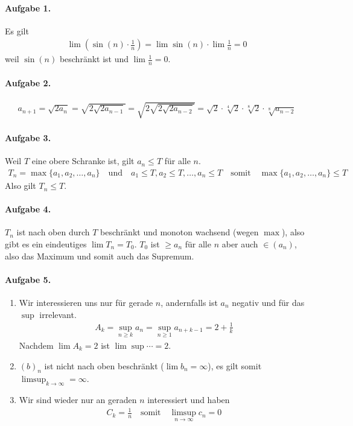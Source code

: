 \documentclass{article}
\begin{document}
\paragraph{Aufgabe 1.} Es gilt
\begin{align*}
    \lim \left(\sin(n) \cdot \frac{1}{n}\right) = \lim\sin(n) \cdot \lim\frac{1}{n} = 0
\end{align*}
weil $\sin(n)$ beschränkt ist und $\lim \frac{1}{n} = 0$.

\paragraph*{Aufgabe 2.}
\begin{align*}
    a_{n + 1} = \sqrt{2a_n} = \sqrt{2\sqrt{2a_{n - 1}}} = \sqrt{2\sqrt{2\sqrt{2a_{n - 2}}}} = \sqrt{2} \cdot \sqrt[4]{2} \cdot \sqrt[8]{2} \cdot \sqrt[8]{a_{n - 2}} 
\end{align*}

\paragraph{Aufgabe 3.} Weil $T$ eine obere Schranke ist, gilt $a_n \leq T$ für alle $n$.
\begin{align*}
    T_n = \max\{a_1, a_2, \ldots, a_n\} \quad \text{und} \quad a_1 \leq T, a_2 \leq T, \ldots, a_n \leq T \quad \text{somit} \quad \max\{a_1, a_2, \ldots, a_n\} \leq T
\end{align*}
Also gilt $T_n \leq T$.

\paragraph*{Aufgabe 4.} $T_n$ ist nach oben durch $T$ beschränkt und monoton wachsend (wegen $\max$), also gibt es ein eindeutiges $\lim T_n = T_0$. $T_0$ ist $\geq a_n$ für alle $n$ aber auch $\in (a_n)$, also das Maximum und somit auch das Supremum. 

\paragraph*{Aufgabe 5.}
\begin{enumerate}
    \item Wir interessieren uns nur für gerade $n$, andernfalls ist $a_n$ negativ und für das $\sup$ irrelevant.
    \begin{align*}
        A_k = \sup_{n \geq k} a_n = \sup_{n \geq 1}a_{n + k - 1} = 2 + \frac{1}{k}
    \end{align*}
    Nachdem $\lim A_k = 2$ ist $\lim \sup \cdots = 2$.

    \item $(b)_n$ ist nicht nach oben beschränkt ($\lim b_n = \infty$), es gilt somit $\limsup_{k \to \infty} = \infty$.
    
    \item Wir sind wieder nur an geraden $n$ interessiert und haben
    \begin{align*}
        C_k = \frac{1}{n} \quad \text{somit} \quad \limsup_{n \to \infty} c_n = 0
    \end{align*}
\end{enumerate}
\end{document}
